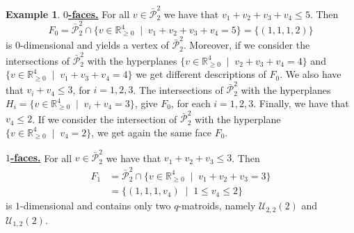 \documentclass[a4paper,11pt,reqno]{amsart}
\theoremstyle{definition}
\newtheorem{example}[theorem]{{{Example}}}
\newcommand{\mU}{\mathcal{U}}
\begin{document}
{\begin{example}
\noindent \underline{\textbf{$0$-faces.}} For all $v\in\bar{\mathcal{P}}_2^2$ we have that $v_1+v_2+v_3+v_4\leq 5$. Then 
        \[
            F_0 = \bar{\mathcal{P}}_2^2\cap\{v\in\mathbb{R}_{\geq 0}^4\;\mid\;v_1+v_2+v_3+v_4=5\}=\{(1,1,1,2)\}
        \]
        is $0$-dimensional and yields a vertex of $\bar{\mathcal{P}}_2^2$. 
        Moreover, if we consider the intersections of  $\bar{\mathcal{P}}_2^2$ with the hyperplanes $\{v\in\mathbb{R}_{\geq 0}^4\;\mid\;v_2+v_3+v_4=4\}$ and $\{v\in\mathbb{R}_{\geq 0}^4\;\mid\;v_1+v_3+v_4=4\}$
        we get different descriptions of $F_0$.
        We also have that $v_i+v_4\leq 3$, for $i=1,2,3$. 
        The intersections of $\bar{\mathcal{P}}_2^2$ with the hyperplanes $H_i=\{v\in\mathbb{R}_{\geq 0}^4\;\mid\;v_i+v_4=3\}$, give $F_0$, for each $i=1,2,3$.
        Finally, we have that $v_4\leq 2$. If we consider the intersection of $\bar{\mathcal{P}}_2^2$ with the hyperplane $\{v\in\mathbb{R}_{\geq 0}^4\;\mid\;v_4=2\}$, we get again the same face $F_0$.
        
\noindent \underline{\textbf{$1$-faces.}} For all $v\in\bar{\mathcal{P}}_2^2$ we have that $v_1+v_2+v_3\leq 3$. Then
    \begin{align*}
        F_1 &= \bar{\mathcal{P}}_2^2\cap\{v\in\mathbb{R}_{\geq 0}^4\;\mid\;v_1+v_2+v_3=3\}\\
        &=\{(1,1,1,v_4)\;\mid\; 1\leq v_4\leq 2\}
    \end{align*}
is $1$-dimensional and contains only two $q$-matroids, namely $\mU_{2,2}(2)$ and $\mU_{1,2}(2)$. 


\end{example}}
\end{document}
